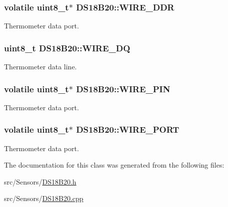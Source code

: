 \subsubsection[{\texorpdfstring{W\+I\+R\+E\+\_\+\+D\+DR}{WIRE_DDR}}]{\setlength{\rightskip}{0pt plus 5cm}volatile uint8\+\_\+t$\ast$ D\+S18\+B20\+::\+W\+I\+R\+E\+\_\+\+D\+DR\hspace{0.3cm}{\ttfamily [private]}}\hypertarget{classDS18B20_a06a1f548d087b8d8971dee5e94653f5c}{}\label{classDS18B20_a06a1f548d087b8d8971dee5e94653f5c}


Thermometer data port. 

\subsubsection[{\texorpdfstring{W\+I\+R\+E\+\_\+\+DQ}{WIRE_DQ}}]{\setlength{\rightskip}{0pt plus 5cm}uint8\+\_\+t D\+S18\+B20\+::\+W\+I\+R\+E\+\_\+\+DQ\hspace{0.3cm}{\ttfamily [private]}}\hypertarget{classDS18B20_aebc6a6ab3c604f19dac9a24ef3301938}{}\label{classDS18B20_aebc6a6ab3c604f19dac9a24ef3301938}


Thermometer data line. 

\subsubsection[{\texorpdfstring{W\+I\+R\+E\+\_\+\+P\+IN}{WIRE_PIN}}]{\setlength{\rightskip}{0pt plus 5cm}volatile uint8\+\_\+t$\ast$ D\+S18\+B20\+::\+W\+I\+R\+E\+\_\+\+P\+IN\hspace{0.3cm}{\ttfamily [private]}}\hypertarget{classDS18B20_a03a1ad890f9713fc10dc353c9779a7f2}{}\label{classDS18B20_a03a1ad890f9713fc10dc353c9779a7f2}


Thermometer data port. 

\subsubsection[{\texorpdfstring{W\+I\+R\+E\+\_\+\+P\+O\+RT}{WIRE_PORT}}]{\setlength{\rightskip}{0pt plus 5cm}volatile uint8\+\_\+t$\ast$ D\+S18\+B20\+::\+W\+I\+R\+E\+\_\+\+P\+O\+RT\hspace{0.3cm}{\ttfamily [private]}}\hypertarget{classDS18B20_a4e8d420cd118999883bde12e766bc1d4}{}\label{classDS18B20_a4e8d420cd118999883bde12e766bc1d4}


Thermometer data port. 



The documentation for this class was generated from the following files\+:\begin{DoxyCompactItemize}
\item 
src/\+Sensors/\hyperlink{DS18B20_8h}{D\+S18\+B20.\+h}\item 
src/\+Sensors/\hyperlink{DS18B20_8cpp}{D\+S18\+B20.\+cpp}\end{DoxyCompactItemize}
